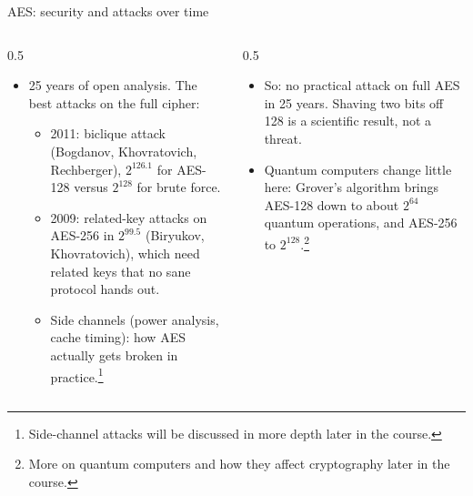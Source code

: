 \ifdefined\PRESENTATION\else\PassOptionsToClass{handout}{beamer}\fi\documentclass[aspectratio=169, lualatex]{beamer}
\begin{document}
\begin{frame}{AES: security and attacks over time}
	\begin{columns}[c]
		\begin{column}{0.5\textwidth}
			\begin{itemize}
				\item 25 years of open analysis. The best attacks on the full cipher:
				      \begin{itemize}
					      \item 2011: biclique attack (Bogdanov, Khovratovich, Rechberger), $2^{126.1}$ for AES-128 versus $2^{128}$ for brute force.
					      \item 2009: related-key attacks on AES-256 in $2^{99.5}$ (Biryukov, Khovratovich), which need related keys that no sane protocol hands out.
					      \item Side channels (power analysis, cache timing): how AES actually gets broken in practice.\footnote{Side-channel attacks will be discussed in more depth later in the course.}
				      \end{itemize}
			\end{itemize}
		\end{column}
		\begin{column}{0.5\textwidth}
			\begin{itemize}
				\item So: no practical attack on full AES in 25 years. Shaving two bits off 128 is a scientific result, not a threat.
				\item Quantum computers change little here: Grover's algorithm brings AES-128 down to about $2^{64}$ quantum operations, and AES-256 to $2^{128}$.\footnote{More on quantum computers and how they affect cryptography later in the course.}
			\end{itemize}
		\end{column}
	\end{columns}
\end{frame}
\end{document}
